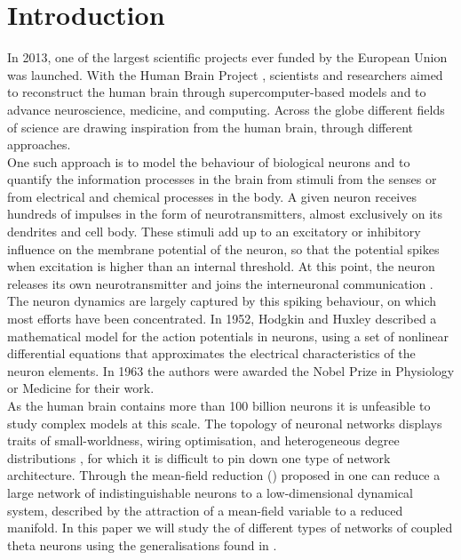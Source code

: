 \newpage
\section{Introduction}
\noindent In 2013, one of the largest scientific projects ever funded by the European Union was launched. With the Human Brain Project \cite{humanbrainproject}, scientists and researchers aimed to reconstruct the human brain through supercomputer-based models and to advance neuroscience, medicine, and computing. Across the globe different fields of science are drawing inspiration from the human brain, through different approaches. \\
One such approach is to model the behaviour of biological neurons and to quantify the information processes in the brain from stimuli from the senses or from electrical and chemical processes in the body. A given neuron receives hundreds of impulses in the form of neurotransmitters, almost exclusively on its dendrites and cell body. These stimuli add up to an excitatory or inhibitory influence on the membrane potential of the neuron, so that the potential spikes when excitation is higher than an internal threshold. At this point, the neuron releases its own neurotransmitter and joins the interneuronal communication \cite{IntroductionModelingDynamics}. The neuron dynamics are largely captured by this spiking behaviour, on which most efforts have been concentrated.
In 1952, Hodgkin and Huxley described a mathematical model for the action potentials in neurons, using a set of nonlinear differential equations that approximates the electrical characteristics of the neuron elements. In 1963 the authors were awarded the Nobel Prize in Physiology or Medicine \cite{nobel1963} for their work.\\
As the human brain contains more than 100 billion neurons \cite{Herculano2009} it is unfeasible to study complex models at this scale. The topology of neuronal networks displays traits of small-worldness, wiring optimisation, and heterogeneous degree distributions \cite{Bullmore2010}, for which it is difficult to pin down one type of network architecture. Through the mean-field reduction (\mfr) proposed in \cite{OttAntonsen2008} one can reduce a large network of indistinguishable neurons to a low-dimensional dynamical system, described by the attraction of a mean-field variable to a reduced manifold.
In this paper we will study the \mfr of different types of networks of coupled theta neurons using the generalisations found in \cite{OttAntonsen2017}.


